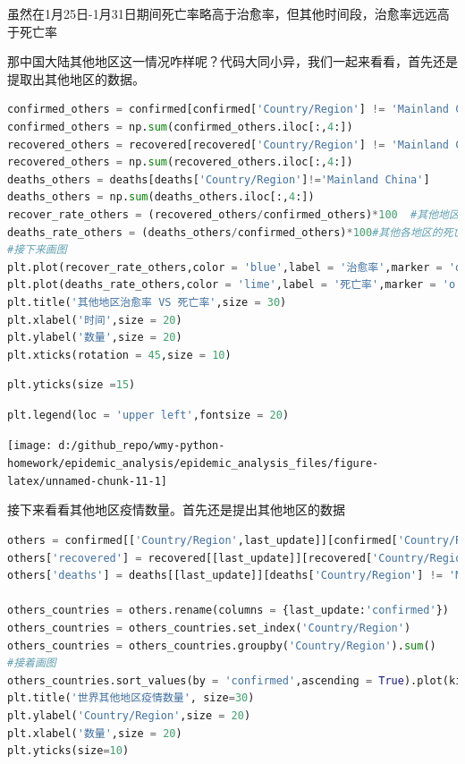 \documentclass[UTF8,a4paper,12pt]{ctexart}  %
\begin{document}
虽然在1月25日-1月31日期间死亡率略高于治愈率，但其他时间段，治愈率远远高于死亡率

那中国大陆其他地区这一情况咋样呢？代码大同小异，我们一起来看看，首先还是提取出其他地区的数据。

\begin{lstlisting}[language=Python]
confirmed_others = confirmed[confirmed['Country/Region'] != 'Mainland China']
confirmed_others = np.sum(confirmed_others.iloc[:,4:])
recovered_others = recovered[recovered['Country/Region'] != 'Mainland China']
recovered_others = np.sum(recovered_others.iloc[:,4:])
deaths_others = deaths[deaths['Country/Region']!='Mainland China']
deaths_others = np.sum(deaths_others.iloc[:,4:])
recover_rate_others = (recovered_others/confirmed_others)*100  #其他地区的治愈率
deaths_rate_others = (deaths_others/confirmed_others)*100#其他各地区的死亡率
#接下来画图
plt.plot(recover_rate_others,color = 'blue',label = '治愈率',marker = 'o')
plt.plot(deaths_rate_others,color = 'lime',label = '死亡率',marker = 'o')
plt.title('其他地区治愈率 VS 死亡率',size = 30)
plt.xlabel('时间',size = 20)
plt.ylabel('数量',size = 20)
plt.xticks(rotation = 45,size = 10)
\end{lstlisting}

\begin{lstlisting}[language=Python]
plt.yticks(size =15)
\end{lstlisting}

\begin{lstlisting}[language=Python]
plt.legend(loc = 'upper left',fontsize = 20)
\end{lstlisting}

\begin{center}\texttt{[image: d:/github\_repo/wmy-python-homework/epidemic\_analysis/epidemic\_analysis\_files/figure-latex/unnamed-chunk-11-1]} \end{center}

接下来看看其他地区疫情数量。首先还是提出其他地区的数据

\begin{lstlisting}[language=Python]
others = confirmed[['Country/Region',last_update]][confirmed['Country/Region'] != 'Mainland China']
others['recovered'] = recovered[[last_update]][recovered['Country/Region'] != 'Mainland China']
others['deaths'] = deaths[[last_update]][deaths['Country/Region'] != 'Mainland China']

others_countries = others.rename(columns = {last_update:'confirmed'})
others_countries = others_countries.set_index('Country/Region')
others_countries = others_countries.groupby('Country/Region').sum()
#接着画图
others_countries.sort_values(by = 'confirmed',ascending = True).plot(kind='barh',figsize=(20,30),color = ['red','blue','lime'], width=1,rot=2)
plt.title('世界其他地区疫情数量', size=30)
plt.ylabel('Country/Region',size = 20)
plt.xlabel('数量',size = 20)
plt.yticks(size=10)
\end{lstlisting}
\end{document}
